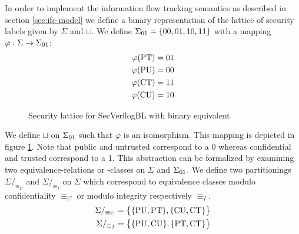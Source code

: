 In order to implement the information flow tracking semantics as described in section \ref{sec:ifc-model} we define a binary representation of the lattice of security labels given by $ \Sigma $ and $ \sqcup $.
We define $ \Sigma_{01} = \{ 00, 01, 10, 11 \}$ with a mapping $ \varphi : \Sigma \rightarrow \Sigma_{01} $:
\begin{align*}
    \varphi(\text{PT}) &= 01 \\
    \varphi(\text{PU}) &= 00 \\
    \varphi(\text{CT}) &= 11 \\
    \varphi(\text{CU}) &= 10
\end{align*}

\begin{figure}
    \centering
    \caption{Security lattice for SecVerilogBL \cite{Ferraiuolo17} with binary equivalent}
    \label{fig:sec-lattice-bin}
\end{figure}

We define $ \sqcup $ on $ \Sigma_{01} $ such that $ \varphi $ is an isomorphism.
This mapping is depicted in figure \ref{fig:sec-lattice-bin}.
Note that public and untrusted correspond to a 0 whereas confidential and trusted correspond to a 1.
This abstraction can be formalized by examining two equivalence-relations or -classes on $ \Sigma $ and $ \Sigma_{01} $.
We define two partitionings $ \Sigma/_{\equiv_C} $ and $ \Sigma/_{\equiv_I} $ on $ \Sigma $ which correspond to equivalence classes modulo confidentiality $ \equiv_C $ or modulo integrity respectively $ \equiv_I $.
\begin{align*}
    \Sigma /_{\equiv_C} &= \big\{ \{ \text{PU}, \text{PT} \}, \{ \text{CU}, \text{CT} \} \big\} \\
    \Sigma /_{\equiv_I} &= \big\{ \{ \text{PU}, \text{CU} \}, \{ \text{PT}, \text{CT} \} \big\}
\end{align*}

